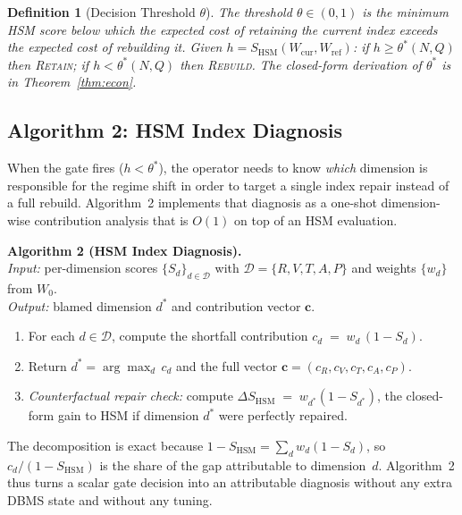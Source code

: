 \documentclass[10pt,twocolumn,a4paper]{article}
\newtheorem{definition}{Definition}
\newcommand{\SHSM}{S_{\mathrm{HSM}}}
\newcommand{\thetastar}{\theta^{*}}
\begin{document}
\begin{definition}[Decision Threshold $\theta$]
The threshold $\theta\in(0,1)$ is the minimum HSM score below which the
expected cost of retaining the current index exceeds the expected cost of
rebuilding it. Given $h\!=\!\SHSM(W_{\mathrm{cur}},W_{\mathrm{ref}})$:
if $h\geq\thetastar(N,Q)$ then \textsc{Retain}; if $h<\thetastar(N,Q)$
then \textsc{Rebuild}. The closed-form derivation of $\thetastar$ is in
Theorem~\ref{thm:econ}.
\end{definition}

\subsection{Algorithm 2: HSM Index Diagnosis}\label{sec:alg2}

When the gate fires ($h<\thetastar$), the operator needs to know
\emph{which} dimension is responsible for the regime shift in order to
target a single index repair instead of a full rebuild. Algorithm~2
implements that diagnosis as a one-shot dimension-wise contribution
analysis that is $O(1)$ on top of an HSM evaluation.

\smallskip
\noindent\textbf{Algorithm 2 (HSM Index Diagnosis).}\\
\emph{Input:} per-dimension scores $\{S_d\}_{d\in\mathcal{D}}$ with
$\mathcal{D}=\{R,V,T,A,P\}$ and weights $\{w_d\}$ from $W_0$.\\
\emph{Output:} blamed dimension $d^{*}$ and contribution vector $\mathbf{c}$.
\begin{enumerate}
\item For each $d\in\mathcal{D}$, compute the shortfall contribution
      $c_d \;=\; w_d\,(1-S_d).$
\item Return $d^{*}=\arg\max_{d}\,c_d$ and the full vector
      $\mathbf{c}=(c_R,c_V,c_T,c_A,c_P)$.
\item \emph{Counterfactual repair check:} compute
      $\Delta\SHSM \;=\; w_{d^{*}}(1-S_{d^{*}})$, the closed-form gain
      to HSM if dimension $d^{*}$ were perfectly repaired.
\end{enumerate}

The decomposition is exact because $1-\SHSM=\sum_d w_d(1-S_d)$, so
$c_d/(1-\SHSM)$ is the share of the gap attributable to dimension~$d$.
Algorithm~2 thus turns a scalar gate decision into an attributable
diagnosis without any extra DBMS state and without any tuning.
\end{document}
